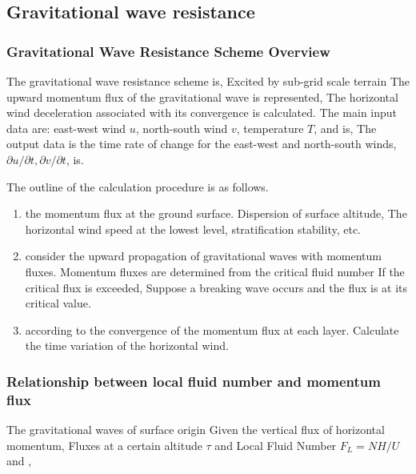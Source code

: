 \hypertarget{gravitational-wave-resistance}{%
\subsection{Gravitational wave
resistance}\label{gravitational-wave-resistance}}

\hypertarget{gravitational-wave-resistance-scheme-overview}{%
\subsubsection{Gravitational Wave Resistance Scheme
Overview}\label{gravitational-wave-resistance-scheme-overview}}

The gravitational wave resistance scheme is, Excited by sub-grid scale
terrain The upward momentum flux of the gravitational wave is
represented, The horizontal wind deceleration associated with its
convergence is calculated. The main input data are: east-west wind
\(u\), north-south wind \(v\), temperature \(T\), and is, The output
data is the time rate of change for the east-west and north-south winds,
\(\partial u/\partial t, \partial v/\partial t\), is.

The outline of the calculation procedure is as follows.

\begin{enumerate}
\def\labelenumi{\arabic{enumi}.}
\item
  the momentum flux at the ground surface. Dispersion of surface
  altitude, The horizontal wind speed at the lowest level,
  stratification stability, etc.
\item
  consider the upward propagation of gravitational waves with momentum
  fluxes. Momentum fluxes are determined from the critical fluid number
  If the critical flux is exceeded, Suppose a breaking wave occurs and
  the flux is at its critical value.
\item
  according to the convergence of the momentum flux at each layer.
  Calculate the time variation of the horizontal wind.
\end{enumerate}

\hypertarget{relationship-between-local-fluid-number-and-momentum-flux}{%
\subsubsection{Relationship between local fluid number and momentum
flux}\label{relationship-between-local-fluid-number-and-momentum-flux}}

The gravitational waves of surface origin Given the vertical flux of
horizontal momentum, Fluxes at a certain altitude \(\tau\) and Local
Fluid Number \(F_L = NH/U\) and ,

